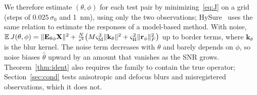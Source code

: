 \documentclass[journal]{IEEEtran}
\begin{document}
We therefore estimate $(\theta,\phi)$ for each test pair by minimizing~\eqref{eq:J} on a grid (steps of $0.025\,\sigma_0$ and 1~nm), using only the two observations; HySure~\cite{simoes2015hysure} uses the same relation to estimate the responses of a model-based method. With noise, $\mathbb{E}\,J(\theta,\phi)=\|\mathbf{E}_{\theta\phi}\mathbf{X}\|^2+\tfrac{N}{s^2}\big(M\varsigma_{\mathrm{M}}^2\|\mathbf{k}_\theta\|^2+\varsigma_{\mathrm{H}}^2\|\mathbf{r}_\phi\|_F^2\big)$ up to border terms, where $\mathbf{k}_\theta$ is the blur kernel. The noise term decreases with $\theta$ and barely depends on $\phi$, so noise biases $\hat\theta$ upward by an amount that vanishes as the SNR grows. Theorem~\ref{thm:ident} also requires the family to contain the true operator; Section~\ref{sec:cond} tests anisotropic and defocus blurs and misregistered observations, which it does not.
\end{document}
